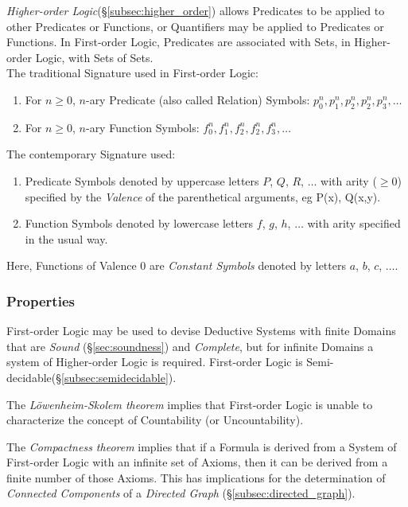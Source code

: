 \documentclass{article}
\begin{document}
\emph{Higher-order Logic}(\S\ref{subsec:higher_order}) allows Predicates
to be applied to other Predicates or Functions, or Quantifiers may be
applied to Predicates or Functions. In First-order Logic, Predicates
are associated with Sets, in Higher-order Logic, with Sets of
Sets.
\\
The traditional Signature used in First-order Logic:
\begin{enumerate}
\item For $n \geq 0$, $n$-ary Predicate (also called Relation)
  Symbols: $p^{n}_0, p^{n}_1, p^{n}_2, p^{n}_2, p^{n}_3, \ldots$
\item For $n \geq 0$, $n$-ary Function Symbols: $f^{n}_0, f^{n}_1,
  f^{n}_2, f^{n}_2, f^{n}_3, \ldots$
\end{enumerate}
The contemporary Signature used:
\begin{enumerate}
\item Predicate Symbols denoted by uppercase letters $P$, $Q$, $R$,
  $\ldots$ with arity ($\geq 0$) specified by the \emph{Valence} of the
  parenthetical arguments, eg P(x), Q(x,y).
\item Function Symbols denoted by lowercase letters $f$, $g$, $h$,
  $\ldots$ with arity specified in the usual way.
\end{enumerate}
Here, Functions of Valence 0 are \emph{Constant Symbols} denoted by
letters $a$, $b$, $c$, $\ldots$.

\subsubsection{Properties}\label{subsec:firstorder_properties}

First-order Logic may be used to devise Deductive Systems with finite
Domains that are \emph{Sound} (\S\ref{sec:soundness}) and
\emph{Complete}, but for infinite Domains a system of Higher-order
Logic is required. First-order Logic is
Semi-decidable(\S\ref{subsec:semidecidable}).

The \emph{L\"owenheim-Skolem theorem} implies that First-order Logic
is unable to characterize the concept of Countability (or
Uncountability).

The \emph{Compactness theorem} implies that if a Formula is derived
from a System of First-order Logic with an infinite set of Axioms,
then it can be derived from a finite number of those Axioms. This has
implications for the determination of \emph{Connected Components} of a
\emph{Directed Graph} (\S\ref{subsec:directed_graph}).
\end{document}
